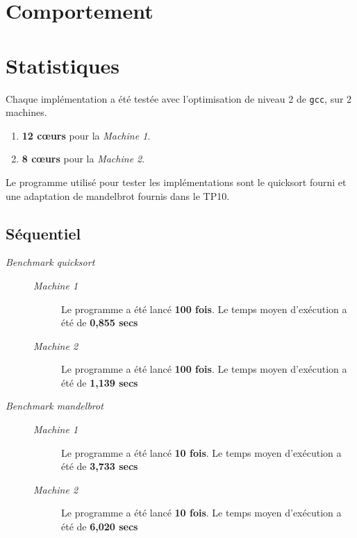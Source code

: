 \documentclass{article}
\def\coeurs{c\oe{}urs}
\def\mone{\textit{Machine 1}} %
\def\mtwo{\textit{Machine 2}} %
\def\bone{\textit{Benchmark quicksort}}
\def\btwo{\textit{Benchmark mandelbrot}}
\begin{document}
\section{Comportement}

\section{Statistiques}

Chaque implémentation a été testée avec l'optimisation de niveau 2
de \texttt{gcc}, sur 2 machines.

\begin{enumerate}
  \item \textbf{12 \coeurs} pour la \mone.
  \item \textbf{8 \coeurs} pour la \mtwo.
\end{enumerate}

Le programme utilisé pour tester les implémentations sont le quicksort fourni
et une adaptation de mandelbrot fournis dans le TP10.

\subsection{Séquentiel}\label{stats:seq}
\begin{description}
  \item[\bone] \hspace{1em}
        \begin{description}
          \item[\mone] Le programme a été lancé \textbf{100 fois}.
                Le temps moyen d'exécution a été de \textbf{0,855 secs}
          \item[\mtwo] Le programme a été lancé \textbf{100 fois}.
                Le temps moyen d'exécution a été de \textbf{1,139 secs}
        \end{description}

  \item[\btwo] \hspace{1em}
        \begin{description}
          \item[\mone] Le programme a été lancé \textbf{10 fois}.
                Le temps moyen d'exécution a été de \textbf{3,733 secs}
          \item[\mtwo] Le programme a été lancé \textbf{10 fois}.
                Le temps moyen d'exécution a été de \textbf{6,020 secs}
        \end{description}
\end{description}
\end{document}
